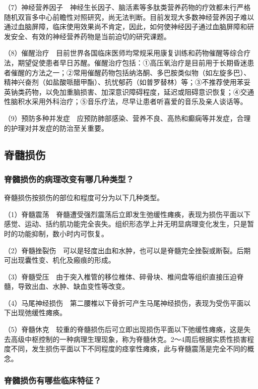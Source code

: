 （7）神经营养因子　神经生长因子、脑活素等多肽类营养药物的疗效都未行严格随机双盲多中心前瞻性对照研究，尚无法判断。目前发现大多数神经营养因子难以通过血脑屏障，临床使用效果尚不肯定，因此，如何使神经因子通过血脑屏障和研发安全、有效的神经营养药物是当前迫切的研究课题。

（8）催醒治疗　目前世界各国临床医师均常规采用康复训练和药物催醒等综合疗法，期望促使患者早日苏醒。催醒治疗包括：①高压氧治疗是目前用于长期昏迷患者催醒的方法之一；②常用催醒药物包括纳洛酮、多巴胺类似物（如左旋多巴）、精神兴奋剂（如盐酸哌醋甲酯）、抗忧郁药（如普罗替林）等；③不推荐使用苯妥英钠类药物，以免加重脑损害、加深意识障碍程度，延迟或阻碍意识恢复；④交通性脑积水采用外科治疗；⑤音乐疗法，尽早让患者听喜爱的音乐及亲人谈话等。

（9）预防多种并发症　应预防肺部感染、营养不良、高热和癫痫等并发症，合理的护理对并发症的防治至关重要。

\subsection{脊髓损伤}

\subsubsection{脊髓损伤的病理改变有哪几种类型？}

脊髓损伤按损伤的部位和程度可分为以下几种类型。

（1）脊髓震荡　脊髓遭受强烈震荡后立即发生弛缓性瘫痪，表现为损伤平面以下感觉、运动、括约肌功能完全丧失。组织形态学上并无明显病理变化发生，只是暂时的功能抑制，数小时内可恢复。

（2）脊髓挫裂伤　可以是轻度出血和水肿，也可以是脊髓完全挫裂或断裂。后期可出现囊性变、机化及瘢痕的形成。

（3）脊髓受压　由于突入椎管的移位椎体、碎骨块、椎间盘等组织直接压迫脊髓，导致出血、水肿、缺血变性等改变。

（4）马尾神经损伤　第二腰椎以下骨折可产生马尾神经损伤，表现为受伤平面以下出现弛缓性瘫痪。

（5）脊髓休克　较重的脊髓损伤后可立即出现损伤平面以下弛缓性瘫痪，这是失去高级中枢控制的一种病理生理现象，称为脊髓休克。2～4周后根据实质性损害程度不同，发生损伤平面以下不同程度的痉挛性瘫痪，此与脊髓震荡是完全不同的概念。

\subsubsection{脊髓损伤有哪些临床特征？}

